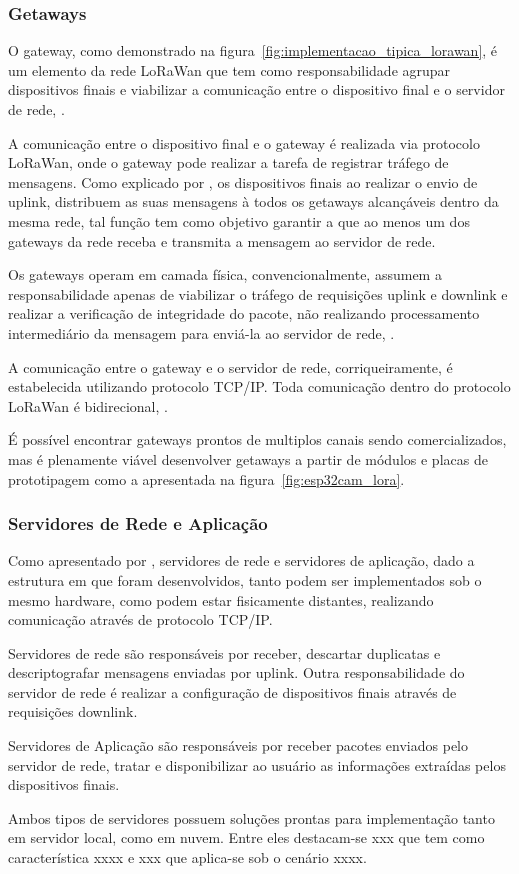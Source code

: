 \subsubsection{Getaways}

O gateway, como demonstrado na figura~\ref{fig:implementacao_tipica_lorawan}, é um elemento da rede LoRaWan que tem como responsabilidade agrupar dispositivos finais e viabilizar a comunicação entre o dispositivo final e o servidor de rede, \cite{Camargo2022}. 

A comunicação entre o dispositivo final e o gateway é realizada via protocolo LoRaWan, onde o gateway pode realizar a tarefa de registrar tráfego de mensagens. 
Como explicado por , os dispositivos finais ao realizar o envio de uplink, distribuem as suas mensagens à todos os getaways alcançáveis dentro da mesma rede, tal função tem como objetivo garantir a que ao menos um dos gateways da rede receba e transmita a mensagem ao servidor de rede.

Os gateways operam em camada física, convencionalmente, assumem a responsabilidade apenas de viabilizar o tráfego de requisições uplink e downlink e realizar a verificação de integridade do pacote, não realizando processamento intermediário da mensagem para enviá-la ao servidor de rede, \cite{semtech2024an1200_86}.

A comunicação entre o gateway e o servidor de rede, corriqueiramente, é estabelecida utilizando protocolo TCP/IP. Toda comunicação dentro do protocolo LoRaWan é bidirecional, \cite{Camargo2022}.

É possível encontrar gateways prontos de multiplos canais sendo comercializados, mas é plenamente viável desenvolver getaways a partir de módulos e placas de prototipagem como a apresentada na figura~\ref{fig:esp32cam_lora}. 

\subsubsection{Servidores de Rede e Aplicação}

Como apresentado por , servidores de rede e servidores de aplicação, dado a estrutura em que foram desenvolvidos, tanto podem ser implementados sob o mesmo hardware, como podem estar fisicamente distantes, realizando comunicação através de protocolo TCP/IP.

Servidores de rede são responsáveis por receber, descartar duplicatas e descriptografar mensagens enviadas por uplink. Outra responsabilidade do servidor de rede é realizar a configuração de dispositivos finais através de requisições downlink.

Servidores de Aplicação são responsáveis por receber pacotes enviados pelo servidor de rede, tratar e disponibilizar ao usuário as informações extraídas pelos dispositivos finais.

Ambos tipos de servidores possuem soluções prontas para implementação tanto em servidor local, como em nuvem. Entre eles destacam-se xxx que tem como característica xxxx e xxx que aplica-se sob o cenário xxxx.

